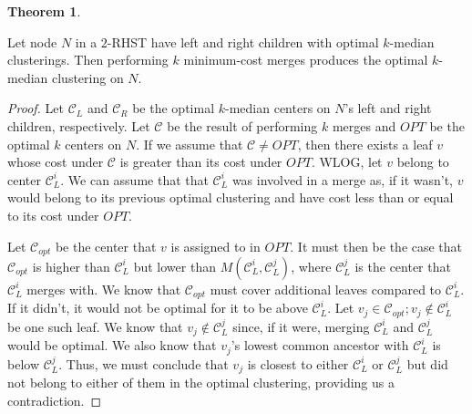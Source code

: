 \documentclass{article}
\theoremstyle{definition}
\newtheorem{theorem}{Theorem}
\begin{document}
\begin{theorem}
    \label{optimality-preservation}

    Let node $N$ in a $2$-RHST have left and right children with optimal $k$-median clusterings. Then performing $k$ minimum-cost merges produces the optimal
    $k$-median clustering on $N$.

\end{theorem}
\begin{proof}

    Let $\mathcal{C}_L$ and $\mathcal{C}_R$ be the optimal $k$-median centers on $N$'s left and right children, respectively. Let $\mathcal{C}$ be the result of
    performing $k$ merges and $OPT$ be the optimal $k$ centers on $N$. If we assume that $\mathcal{C} \neq OPT$, then there exists a leaf $v$ whose cost under
    $\mathcal{C}$ is greater than its cost under $OPT$. WLOG, let $v$ belong to center $\mathcal{C}_L^i$. We can assume that that $\mathcal{C}_L^i$ was involved
    in a merge as, if it wasn't, $v$ would belong to its previous optimal clustering and have cost less than or equal to its cost under $OPT$.

    Let $\mathcal{C}_{opt}$ be the center that $v$ is assigned to in $OPT$. It must then be the case that $\mathcal{C}_{opt}$ is higher than
    $\mathcal{C}_L^i$ but lower than $M(\mathcal{C}_L^i, \mathcal{C}_L^j)$, where $\mathcal{C}_L^j$ is the center that $\mathcal{C}_L^i$ merges with.  We
    know that $\mathcal{C}_{opt}$ must cover additional leaves compared to $\mathcal{C}_L^i$. If it didn't, it would not be optimal for it to be above
    $\mathcal{C}_L^i$. Let $v_j \in \mathcal{C}_{opt} ; v_j \notin \mathcal{C}_L^i$ be one such leaf. We know that $v_j \notin \mathcal{C}_L^j$ since, if it
    were, merging $\mathcal{C}_L^i$ and $\mathcal{C}_L^j$ would be optimal. We also know that $v_j$'s lowest common ancestor with $\mathcal{C}_L^i$ is
    below $\mathcal{C}_L^j$. Thus, we must conclude that $v_j$ is closest to either $\mathcal{C}_L^i$ or $\mathcal{C}_L^j$ but did not belong to either of
    them in the optimal clustering, providing us a contradiction.

\end{proof}
\end{document}
